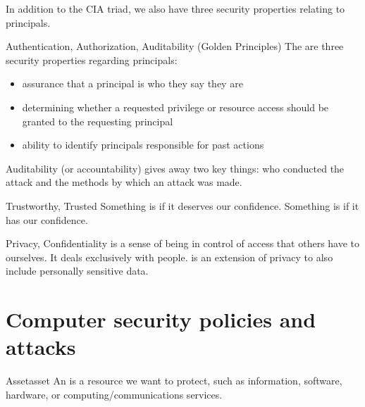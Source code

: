In addition to the CIA triad, we also have three security properties relating to principals.
\begin{dfnbox}{Authentication, Authorization, Auditability (Golden Principles)}{}
    The  are three security properties regarding principals:

    \begin{itemize}[noitemsep]
        \item {} assurance that a principal is who they say they are
        \item {} determining whether a requested privilege or resource access should be granted to the requesting principal
        \item {} ability to identify principals responsible for past actions
    \end{itemize}

\end{dfnbox}

Auditability (or accountability) gives away two key things: who conducted the attack and the methods by which an attack was made.

\begin{dfnbox}{Trustworthy, Trusted}{}
    Something is  if it deserves our confidence.     Something is  if it has our confidence.

\end{dfnbox}

\begin{dfnbox}{Privacy, Confidentiality}{}
     is a sense of being in control of access that others have to ourselves. It deals exclusively with people.  is an extension of privacy to also include personally sensitive data.
\end{dfnbox}

\section{Computer security policies and attacks}

\begin{dfnbox}{Asset}{asset}
    An  is a resource we want to protect, such as information, software, hardware, or computing/communications services.
\end{dfnbox}

